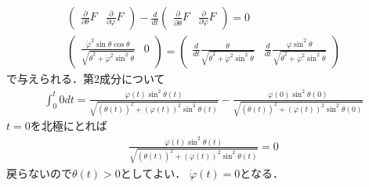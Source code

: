 \documentclass[../main.tex]{subfiles}
\begin{document}
\begin{gather*}
    \begin{pmatrix}
        \displaystyle
        \frac{\partial}{\partial \theta} F
        &
        \displaystyle
        \frac{\partial}{\partial \varphi} F
    \end{pmatrix}
    -
    \frac{d}{dt}
    \begin{pmatrix}
        \displaystyle
        \frac{\partial}{\partial \dot{\theta}} F
        &
        \displaystyle
        \frac{\partial}{\partial \dot{\varphi}} F
    \end{pmatrix}
    = 0
    \\
    \begin{pmatrix}
        \displaystyle
        \frac{\dot{\varphi}^2 \sin \theta \cos \theta}{\sqrt{\dot{\theta}^2 + \dot{\varphi}^2 \sin^2 \theta}}
        &
        0
    \end{pmatrix}
    =
    \begin{pmatrix}
        \displaystyle
        \frac{d}{dt}
        \frac{\dot{\theta}}{\sqrt{\dot{\theta}^2 + \dot{\varphi}^2 \sin^2 \theta}}
        &
        \displaystyle
        \frac{d}{dt}
        \frac{\dot{\varphi} \sin^2\theta}{\sqrt{\dot{\theta}^2 + \dot{\varphi}^2 \sin^2 \theta}}
    \end{pmatrix}
\end{gather*}
で与えられる．第\(2\)成分について
\begin{align*}
    \int_0^t 0 dt =
        \frac{\dot{\varphi}(t) \sin^2\theta(t)}{\sqrt{(\dot{\theta}(t))^2 + (\dot{\varphi}(t))^2 \sin^2 \theta(t)}}
        -
        \frac{\dot{\varphi}(0) \sin^2\theta(0)}{\sqrt{(\dot{\theta}(t))^2 + (\dot{\varphi}(t))^2 \sin^2 \theta(0)}}
\end{align*}
\(t = 0\)を北極にとれば
\begin{align*}
    \frac{\dot{\varphi}(t) \sin^2\theta(t)}{\sqrt{(\dot{\theta}(t))^2 + (\dot{\varphi}(t))^2 \sin^2 \theta(t)}}
    = 0
\end{align*}
戻らないので\(\theta(t) > 0\)としてよい．
\(\dot{\varphi}(t) = 0\)となる．
\end{document}
